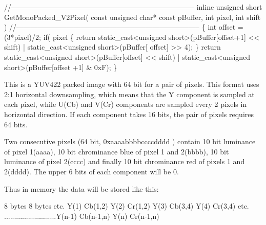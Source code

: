\begin{Desc}
\begin{description}
\begin{DoxyCode}
\textcolor{comment}{//-----------------------------------------------------------------------------}
\textcolor{keyword}{inline} \textcolor{keywordtype}{unsigned} \textcolor{keywordtype}{short} GetMonoPacked\_V2Pixel( \textcolor{keyword}{const} \textcolor{keywordtype}{unsigned} \textcolor{keywordtype}{char}* \textcolor{keyword}{const} pBuffer, \textcolor{keywordtype}{int} pixel, \textcolor{keywordtype}{int} shift )
\textcolor{comment}{//-----------------------------------------------------------------------------}
\{
  \textcolor{keywordtype}{int} offset = (3*pixel)/2;
  \textcolor{keywordflow}{if}( pixel %
  \{
    \textcolor{keywordflow}{return} \textcolor{keyword}{static\_cast<}\textcolor{keywordtype}{unsigned} \textcolor{keywordtype}{short}\textcolor{keyword}{>}(pBuffer[offset+1] << shift) | static\_cast<unsigned short>(pBuffer[
      offset] >> 4);
  \}
  \textcolor{keywordflow}{return} \textcolor{keyword}{static\_cast<}\textcolor{keywordtype}{unsigned} \textcolor{keywordtype}{short}\textcolor{keyword}{>}(pBuffer[offset] << shift) | static\_cast<unsigned short>(pBuffer[offset
      +1] & 0xF);
\}
\end{DoxyCode}
 \item[{\em 
\hypertarget{group___common_interface_gga456e8aa76e06bb761f27c52141475985ae18b5b8e4909d3a9dcbbbda2a4e051ad}{ibpf\+Y\+U\+V422\+\_\+10\+Packed}\label{group___common_interface_gga456e8aa76e06bb761f27c52141475985ae18b5b8e4909d3a9dcbbbda2a4e051ad}
}]This is a Y\+U\+V422 packed image with 64 bit for a pair of pixels. This format uses 2\+:1 horizontal downsampling, which means that the Y component is sampled at each pixel, while U(\+Cb) and V(\+Cr) components are sampled every 2 pixels in horizontal direction. If each component takes 16 bits, the pair of pixels requires 64 bits.

Two consecutive pixels (64 bit, 0xaaaabbbbccccdddd ) contain 10 bit luminance of pixel 1(aaaa), 10 bit chrominance blue of pixel 1 and 2(bbbb), 10 bit luminance of pixel 2(cccc) and finally 10 bit chrominance red of pixels 1 and 2(dddd). The upper 6 bits of each component will be 0.

Thus in memory the data will be stored like this\+:


\begin{DoxyCode}
8 bytes                   8 bytes                         etc.
Y(1) Cb(1,2) Y(2) Cr(1,2) Y(3)   Cb(3,4)   Y(4) Cr(3,4)   etc.
..........................Y(n-1) Cb(n-1,n) Y(n) Cr(n-1,n)
\end{DoxyCode}



\end{description}
\end{Desc}
